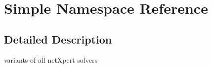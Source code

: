 \hypertarget{namespaceSimple}{}\section{Simple Namespace Reference}
\label{namespaceSimple}


\subsection{Detailed Description}
variants of all net\+Xpert solvers 